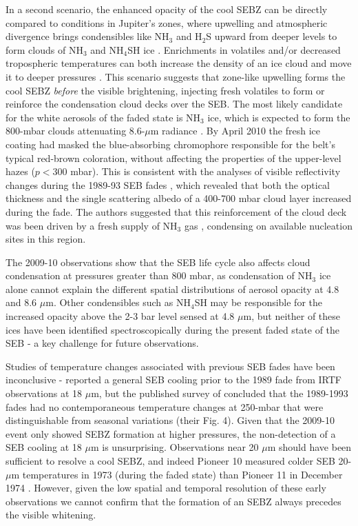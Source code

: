 \documentclass[final,5p,times,twocolumn,authoryear]{elsarticle}
\begin{document}
In a second scenario, the enhanced opacity of the cool SEBZ can be directly compared to conditions in Jupiter's zones, where upwelling and atmospheric divergence brings condensibles like NH$_3$ and H$_2$S upward from deeper levels to form clouds of NH$_3$ and NH$_4$SH ice \citep[i.e., the SEB takes on zone-like properties,][]{94satoh}.  Enrichments in volatiles and/or decreased tropospheric temperatures can both increase the density of an ice cloud and move it to deeper pressures \citep[e.g.,][]{73weidenschilling, 99atreya}.  This scenario suggests that zone-like upwelling forms the cool SEBZ \textit{before} the visible brightening, injecting fresh volatiles to form or reinforce the condensation cloud decks over the SEB.  The most likely candidate for the white aerosols of the faded state is NH$_3$ ice, which is expected to form the 800-mbar clouds attenuating 8.6-$\mu$m radiance \citep[e.g.,][]{73weidenschilling}.  By April 2010 the fresh ice coating had masked the blue-absorbing chromophore responsible for the belt's typical red-brown coloration, without affecting the properties of the upper-level hazes ($p<300$ mbar).   This is consistent with the analyses of visible reflectivity changes during the 1989-93 SEB fades \citep{93kuehn, 92satoh, 94satoh, 97moreno}, which revealed that both the optical thickness and the single scattering albedo of a 400-700 mbar cloud layer increased during the fade. The authors suggested that this reinforcement of the cloud deck was been driven by a fresh supply of NH$_3$ gas \citep[from upward diffusion or convective overshooting][]{93kuehn}, condensing on available nucleation sites in this region.  

The 2009-10 observations show that the SEB life cycle also affects cloud condensation at pressures greater than 800 mbar, as condensation of NH$_3$ ice alone cannot explain the different spatial distributions of aerosol opacity at 4.8 and 8.6 $\mu$m.  Other condensibles such as NH$_4$SH may be responsible for the increased opacity above the 2-3 bar level sensed at 4.8 $\mu$m, but neither of these ices have been identified spectroscopically during the present faded state of the SEB - a key challenge for future observations. 

Studies of temperature changes associated with previous SEB fades have been inconclusive - \citet{92yanamandra} reported a general SEB cooling prior to the 1989 fade from IRTF observations at 18 $\mu$m, but the published survey of \citet{94orton} concluded that the 1989-1993 fades had no contemporaneous temperature changes at 250-mbar that were distinguishable from seasonal variations (their Fig. 4).  Given that the 2009-10 event only showed SEBZ formation at higher pressures, the non-detection of a SEB cooling at 18 $\mu$m is unsurprising.  Observations near 20 $\mu$m should have been sufficient to resolve a cool SEBZ, and indeed Pioneer 10 measured colder SEB 20-$\mu$m temperatures in 1973 (during the faded state) than Pioneer 11 in December 1974 \citep[preceding the July 1975 revival,][]{81orton}.   However, given the low spatial and temporal resolution of these early observations we cannot confirm that the formation of an SEBZ always precedes the visible whitening.  
\end{document}

